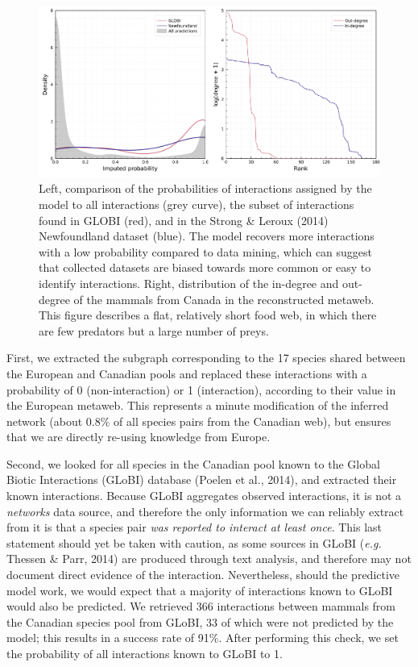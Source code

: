 \documentclass[10pt,oneside]{article}
\makeatletter
\def\maxwidth{\ifdim\Gin@nat@width>\linewidth\linewidth
\else\Gin@nat@width\fi}
\let\Oldincludegraphics\includegraphics
\renewcommand{\includegraphics}[1]{\Oldincludegraphics[width=\maxwidth]{#1}}
\makeatother
\begin{document}
\begin{figure}
\hypertarget{fig:inflation}{%
\centering
\includegraphics{figures/figure-validation.png}
\caption{Left, comparison of the probabilities of interactions assigned
by the model to all interactions (grey curve), the subset of
interactions found in GLOBI (red), and in the Strong \& Leroux (2014)
Newfoundland dataset (blue). The model recovers more interactions with a
low probability compared to data mining, which can suggest that
collected datasets are biased towards more common or easy to identify
interactions. Right, distribution of the in-degree and out-degree of the
mammals from Canada in the reconstructed metaweb. This figure describes
a flat, relatively short food web, in which there are few predators but
a large number of preys.}\label{fig:inflation}
}
\end{figure}

First, we extracted the subgraph corresponding to the 17 species shared
between the European and Canadian pools and replaced these interactions
with a probability of 0 (non-interaction) or 1 (interaction), according
to their value in the European metaweb. This represents a minute
modification of the inferred network (about 0.8\% of all species pairs
from the Canadian web), but ensures that we are directly re-using
knowledge from Europe.

Second, we looked for all species in the Canadian pool known to the
Global Biotic Interactions (GLoBI) database (Poelen et al., 2014), and
extracted their known interactions. Because GLoBI aggregates observed
interactions, it is not a \emph{networks} data source, and therefore the
only information we can reliably extract from it is that a species pair
\emph{was reported to interact at least once}. This last statement
should yet be taken with caution, as some sources in GLoBI (\emph{e.g.}
Thessen \& Parr, 2014) are produced through text analysis, and therefore
may not document direct evidence of the interaction. Nevertheless,
should the predictive model work, we would expect that a majority of
interactions known to GLoBI would also be predicted. We retrieved 366
interactions between mammals from the Canadian species pool from GLoBI,
33 of which were not predicted by the model; this results in a success
rate of 91\%. After performing this check, we set the probability of all
interactions known to GLoBI to 1.
\end{document}
